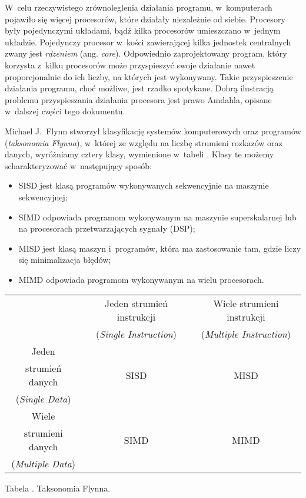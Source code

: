 \documentclass[12pt]{mwart}
\newcounter{tabmain}
\newcommand{\mytabcaption}[1]{ \begin{center}\parbox[t]{11.5cm}{\normalsize{Tabela \arabic{tabmain}. #1.}}\end{center} \addtocounter{tabmain}{1} }
\begin{document}
\par
%
\indent
	W~celu rzeczywistego zrównoleglenia działania programu, w~komputerach pojawiło się więcej procesorów,
	które działały niezależnie od siebie. Procesory były pojedynczymi układami, bądź kilka procesorów umieszczano w~jednym układzie. 
	Pojedynczy procesor w~kości zawierającej kilka jednostek centralnych zwany jest \emph{rdzeniem} (ang. \emph{core}).
	Odpowiednio zaprojektowany program,	który korzysta z~kilku procesorów może przyspieszyć swoje działanie nawet proporcjonalnie do ich liczby,
	na których jest wykonywany.	Takie przyspieszenie działania programu, choć możliwe, jest rzadko spotykane.
	Dobrą ilustracją problemu przyspieszania działania procesora jest prawo Amdahla, opisane w~dalszej części tego dokumentu.
\par
%
 \setcounter{flynn}{\value{tabmain}}
\indent
	Michael J.~Flynn stworzył klasyfikację systemów komputerowych oraz programów (\emph{taksonomia Flynna}), w~której ze względu na liczbę
	strumieni rozkazów oraz danych, wyróżniamy cztery klasy, wymienione w~tabeli .
	Klasy te możemy scharakteryzować w~następujący sposób:
	\begin{itemize}
		\item SISD jest klasą programów wykonywanych sekwencyjnie na maszynie sekwencyjnej;
		\item SIMD odpowiada programom wykonywanym na maszynie superskalarnej lub na procesorach przetwarzających sygnały (DSP);
		\item MISD jest klasą maszyn i~programów, która ma zastosowanie tam, gdzie liczy się minimalizacja błędów;
		\item MIMD odpowiada programom wykonywanym na wielu procesorach.
	\end{itemize}
	\begin{center}
	\centering
	\begin{tabular}{|c|c|c|} \hline
													 & Jeden strumień instrukcji	 & Wiele strumieni instrukcji \\
													 & (\emph{Single Instruction}) & (\emph{Multiple Instruction}) \\\hline
			Jeden                &     												 &      \\
			strumień danych      &  SISD										   & MISD 			\\
			(\emph{Single Data}) &                             & \\\hline
			Wiele                &     												 &      \\
			strumieni danych     & SIMD                        & MIMD \\
			(\emph{Multiple Data}) & 										 & 			\\\hline
	\end{tabular} \nopagebreak
	\mytabcaption{Taksonomia Flynna}
	\end{center}
\end{document}
